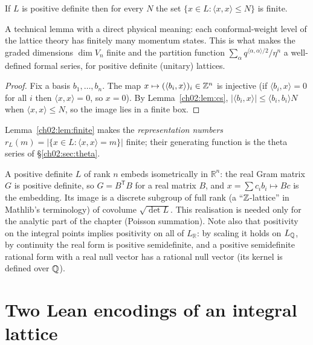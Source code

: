 \begin{lemma}[Finiteness]\label{ch02:lem:finite}
If $L$ is positive definite then for every $N$ the set $\{x\in L:\langle x,x\rangle\le N\}$ is
finite.
\end{lemma}
\begin{physics}
A technical lemma with a direct physical meaning: each conformal-weight level of the lattice theory has finitely many momentum states. This is what makes the graded dimensions $\dim V_n$ finite and the partition function $\sum_\alpha q^{\langle\alpha,\alpha\rangle/2}/\eta^n$ a well-defined formal series, for positive definite (unitary) lattices.
\end{physics}
\begin{proof}
Fix a basis $b_1,\dots,b_n$.  The map $x\mapsto(\langle b_i,x\rangle)_i\in{\mathbb{Z}}^n$ is injective
(if $\langle b_i,x\rangle=0$ for all $i$ then $\langle x,x\rangle=0$, so $x=0$).  By
Lemma~\ref{ch02:lem:cs}, $|\langle b_i,x\rangle|\le\langle b_i,b_i\rangle N$ when $\langle
x,x\rangle\le N$, so the image lies in a finite box.
\end{proof}

Lemma~\ref{ch02:lem:finite} makes the \emph{representation numbers}
$r_L(m)=|\{x\in L:\langle x,x\rangle=m\}|$ finite; their generating function is the theta series
of \S\ref{ch02:sec:theta}.

\begin{remark}\label{ch02:rem:euclid}
A positive definite $L$ of rank $n$ embeds isometrically in $\mathbb{R}^n$: the real Gram matrix
$G$ is positive definite, so $G=B^{\mathsf T}B$ for a real matrix $B$, and $x=\sum c_ib_i\mapsto
Bc$ is the embedding.  Its image is a discrete subgroup of full rank (a ``${\mathbb{Z}}$-lattice'' in
Mathlib's terminology) of covolume $\sqrt{\det L}$.  This realisation is needed only for the
analytic part of the chapter (Poisson summation).  Note also that positivity on the integral
points implies positivity on all of $L_{\mathbb{R}}$: by scaling it holds on $L_{{\mathbb{Q}}}$, by continuity
the real form is positive semidefinite, and a positive semidefinite rational form with a real
null vector has a rational null vector (its kernel is defined over ${\mathbb{Q}}$).
\end{remark}

\section{Two Lean encodings of an integral lattice}\label{ch02:sec:twoencodings}

